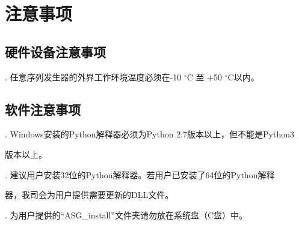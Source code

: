 \chapter{\heiti 注意事项}
\section{\heiti 硬件设备注意事项}
. 任意序列发生器的外界工作环境温度必须在-10 $^{\circ}$C 至 +50 $^{\circ}$C以内。

\section{\heiti 软件注意事项}
. Windows安装的Python解释器必须为Python 2.7版本以上，但不能是Python3

\hspace{-1em}版本以上。

. 建议用户安装32位的Python解释器。若用户已安装了64位的Python解释

\hspace{-1em}器，我司会为用户提供需要更新的DLL文件。

. 为用户提供的“ASG\_install”文件夹请勿放在系统盘（C盘）中。


